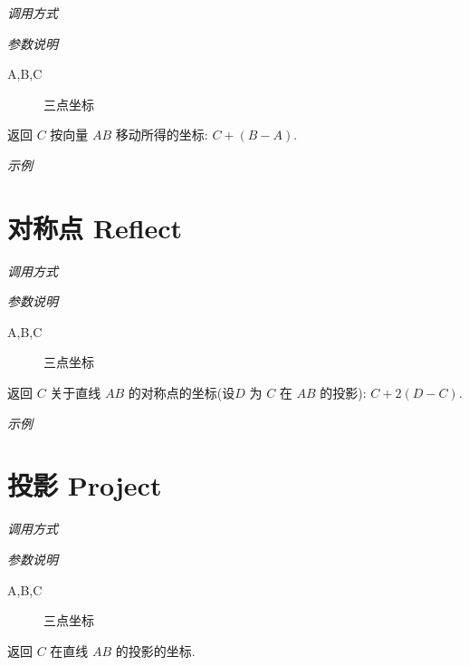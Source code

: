 \emph{调用方式}

\begin{tcolorbox}{}
\end{tcolorbox}

\emph{参数说明}

\begin{description}
  \item[A,B,C] 三点坐标
\end{description}

返回 $C$ 按向量 $AB$ 移动所得的坐标: $C + (B-A)$.

\emph{示例}


\section{对称点 Reflect}

\emph{调用方式}

\begin{tcolorbox}{}
\end{tcolorbox}

\emph{参数说明}

\begin{description}
  \item[A,B,C] 三点坐标
\end{description}

返回 $C$ 关于直线 $AB$ 的对称点的坐标(设$D$ 为 $C$ 在 $AB$ 的投影): $C+2(D-C)$.

\emph{示例}


\section{投影 Project}

\emph{调用方式}

\begin{tcolorbox}{}
\end{tcolorbox}

\emph{参数说明}

\begin{description}
  \item[A,B,C] 三点坐标
\end{description}

返回 $C$ 在直线 $AB$ 的投影的坐标.

